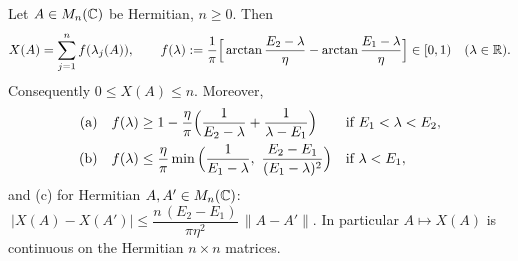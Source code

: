 \begin{lemma}\label{lem:Xspec}\infra{}
Let $A\in M_n(\mathbb{C})$ be Hermitian, $n\ge0$. Then
\[
X(A)=\sum_{j=1}^nf(\lambda_j(A)),\qquad f(\lambda):=\frac1\pi\Big[\arctan\frac{E_2-\lambda}\eta-\arctan\frac{E_1-\lambda}\eta\Big]\in[0,1)\quad(\lambda\in\mathbb{R}).
\]
Consequently $0\le X(A)\le n$. Moreover,
\begin{align*}
\textup{(a)}\quad&f(\lambda)\ge1-\frac\eta\pi\Big(\frac1{E_2-\lambda}+\frac1{\lambda-E_1}\Big)&&\text{if }E_1<\lambda<E_2,\\
\textup{(b)}\quad&f(\lambda)\le\frac\eta\pi\min\Big(\frac1{E_1-\lambda},\ \frac{E_2-E_1}{(E_1-\lambda)^2}\Big)&&\text{if }\lambda<E_1,
\end{align*}
and \textup{(c)} for Hermitian $A,A'\in M_n(\mathbb{C})$: $\ |X(A)-X(A')|\le\dfrac{n\,(E_2-E_1)}{\pi\eta^2}\,\|A-A'\|$. In particular $A\mapsto X(A)$ is continuous
on the Hermitian $n\times n$ matrices.
\end{lemma}
